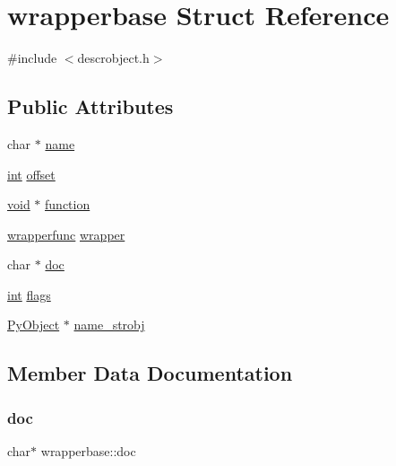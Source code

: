 \hypertarget{structwrapperbase}{}\section{wrapperbase Struct Reference}
\label{structwrapperbase}


{\ttfamily \#include $<$descrobject.\+h$>$}

\subsection*{Public Attributes}
\begin{DoxyCompactItemize}
\item 
char $\ast$ \mbox{\hyperlink{structwrapperbase_a06495b071572d166c15f6b4a8df707e6}{name}}
\item 
\mbox{\hyperlink{warnings_8h_a74f207b5aa4ba51c3a2ad59b219a423b}{int}} \mbox{\hyperlink{structwrapperbase_aee6e2c07d565ab34389ac8d45d952ea2}{offset}}
\item 
\mbox{\hyperlink{_s_d_l__opengles2__gl2ext_8h_ae5d8fa23ad07c48bb609509eae494c95}{void}} $\ast$ \mbox{\hyperlink{structwrapperbase_aab5178ddcd1f1fc7daca3c9df727d773}{function}}
\item 
\mbox{\hyperlink{descrobject_8h_aa0427daa24e34913e3ab0a4cd794ee9b}{wrapperfunc}} \mbox{\hyperlink{structwrapperbase_aaec58b56ee4db0e3c2dba8efa92c942f}{wrapper}}
\item 
char $\ast$ \mbox{\hyperlink{structwrapperbase_a827bda21121a05de0996818cd83c5767}{doc}}
\item 
\mbox{\hyperlink{warnings_8h_a74f207b5aa4ba51c3a2ad59b219a423b}{int}} \mbox{\hyperlink{structwrapperbase_ab7f68db17d76c48f276b35dce235a8a5}{flags}}
\item 
\mbox{\hyperlink{_python27_2object_8h_aadc84ac7aed2cfa6f20c25f62bf3dac7}{Py\+Object}} $\ast$ \mbox{\hyperlink{structwrapperbase_abd81cf31bd8789a91df833b702204433}{name\+\_\+strobj}}
\end{DoxyCompactItemize}


\subsection{Member Data Documentation}
\mbox{\label{structwrapperbase_a827bda21121a05de0996818cd83c5767}} 
\subsubsection{\texorpdfstring{doc}{doc}}
{\footnotesize\ttfamily char$\ast$ wrapperbase\+::doc}

